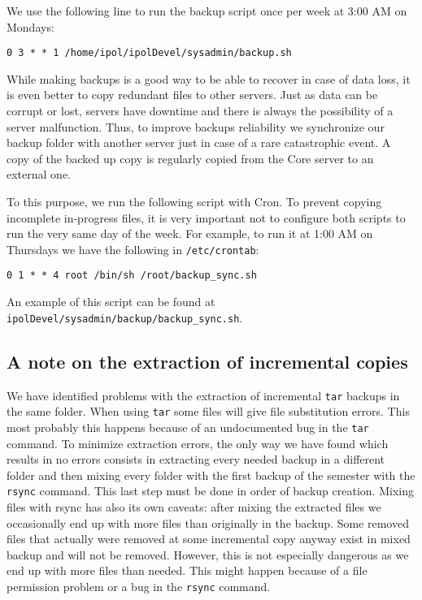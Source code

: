 \documentclass[a4paper,12pt]{article}
\begin{document}
We use the following line to run the backup script once per week at 3:00 AM on Mondays:

{\tt 0 3 * * 1 /home/ipol/ipolDevel/sysadmin/backup.sh}

While making backups is a good way to be able to recover in case of data loss, it is even better to copy redundant files to other servers. Just as data can be corrupt or lost, servers have downtime and there is always the possibility of a server malfunction. Thus, to improve backups reliability we synchronize our backup folder with another server just in case of a rare catastrophic event. A copy of the backed up copy is regularly copied from the Core server to an external one.

To this purpose, we run the following script with Cron. To prevent copying incomplete in-progress files, it is very important not to configure both scripts to run the very same day of the week. For example, to run it at 1:00 AM on Thursdays we have the following in {\tt /etc/crontab}:

{\tt 0 1   * * 4   root     /bin/sh /root/backup\_sync.sh}

An example of this script can be found at {\tt ipolDevel/sysadmin/backup/backup\_sync.sh}.

\subsection{A note on the extraction of incremental copies}
We have identified problems with the extraction of incremental {\tt tar} backups in the same folder. When using {\tt tar} some files will give file substitution errors. This most probably this happens because of an undocumented bug in the {\tt tar} command. To minimize extraction errors, the only way we have found which results in no errors consists in extracting every needed backup in a different folder and then mixing every folder with the first backup of the semester with the {\tt rsync} command. This last step must be done in order of backup creation. Mixing files with rsync has also its own caveats: after mixing the extracted files we occasionally end up with more files than originally in the backup. Some removed files that actually were removed at some incremental copy anyway exist in mixed backup and will not be removed. However, this is not especially dangerous as we end up with more files than needed. This might happen because of a file permission problem or a bug in the {\tt rsync} command.


\end{document}
